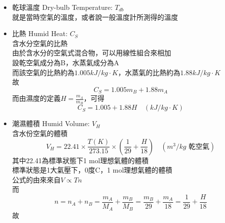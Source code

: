 \documentclass[../main.tex]{subfiles}
\begin{document}
\begin{itemize}
\begin{itemize}
    \item 露點實驗\\
    先將玻璃表面溫度放置在被測空氣中，此時沒有水滴出現($P_A<P_{As}$)\\
    開始降低玻璃表面溫度，直到有水滴出現($P_A=P_{As}$)\\
    此時的玻璃表面溫度即為露點溫度$T_{dew}$
    \begin{equation}
      \frac{d\ln P^{\text{sat}}}{dT} = \frac{\Delta H_{\text{vap}}}{RT^2}
    \end{equation}
    故露點實驗是一個恆壓、恆濕，降溫的過程\\
    在濕度表中
  \end{itemize}
  \item 乾球溫度 Dry-bulb Temperature: $T_{db}$\\
  就是當時空氣的溫度，或者說一般溫度計所測得的溫度
  \item 比熱 Humid Heat: $C_S$\\
  含水分空氣的比熱\\
  由於含水分的空氣式混合物，可以用線性組合來相加\\
  設乾空氣成分為B，水蒸氣成分為A\\
  而該空氣的比熱約為$1.005 kJ/kg\cdot K$，水蒸氣的比熱約為$1.88 kJ/kg\cdot K$\\
  故
  \begin{equation}
    C_S = 1.005 m_B + 1.88 m_A
  \end{equation}
  而由濕度的定義$H = \frac{m_A}{m_B}$，可得
  \begin{equation}
    C_S = 1.005 + 1.88 H \quad (kJ/kg\cdot K)
  \end{equation}
  \item 潮濕體積 Humid Volume: $V_{H}$\\
  含水份空氣的體積
  \begin{equation}
    V_H = 22.41\times \frac{T(K)}{273.15} \times \left(\frac{1}{29}+\frac{H}{18}\right) \quad (m^3/kg\text{ 乾空氣})
  \end{equation}
  其中22.41為標準狀態下1 mol理想氣體的體積\\
  標準狀態是1大氣壓下，0度C，1 mol理想氣體的體積\\
  公式的由來來自$V\propto Tn$\\
  而
  \begin{equation}
    n = n_A + n_B = \frac{m_A}{M_A} + \frac{m_B}{M_B} = \frac{m_B}{29} + \frac{m_A}{18} =
    \frac{1}{29} + \frac{H}{18}
  \end{equation}
  故
  \begin{equation}

\end{equation}
\end{itemize}
\end{document}
